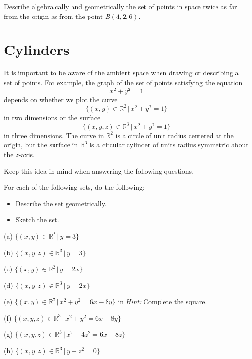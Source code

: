 \documentclass{ximera}
\begin{document}
\begin{example}  \label{Ex:9090dfsadf0}
Describe algebraically and geometrically the set of points in space twice as far from the origin as from the point $B(4,2,6)$.
\end{example}



\section*{Cylinders}

It is important to be aware of the ambient space when drawing or describing a set of points. For example, the graph of the set of points satisfying the equation 
\[
    x^2 + y^2 = 1
\]
depends on whether we plot the curve
\[
   \{  (x,y) \in\mathbb{R}^2 \, | \, x^2 + y^2 = 1 \}
\]
in two dimensions or the surface
\[
   \{  (x,y,z) \in\mathbb{R}^3 \, | \, x^2 + y^2 = 1 \}
\]
in three dimensions. The curve in $\mathbb{R}^2$ is a circle of unit radius centered at the origin, but the surface in $\mathbb{R}^3$ is a circular cylinder of units radius symmetric about the $z$-axis.

Keep this idea in mind when answering the following questions.

\begin{question} \label{Q1:Coordinates}
For each of the following sets, do the following:

\begin{itemize}
\item{Describe the set geometrically.}

\item{Sketch the set.}

\end{itemize}

(a) $\{  (x,y)\in \mathbb{R}^2 \, | \, y=3  \}$

(b) $\{  (x,y,z)\in \mathbb{R}^3 \, | \, y=3  \}$

(c) $\{  (x,y)\in \mathbb{R}^2 \, | \, y=2x  \}$

(d) $\{  (x,y,z)\in \mathbb{R}^3 \, | \, y=2x  \}$

(e) $\{  (x,y)\in \mathbb{R}^2 \, | \,  x^2 + y^2 = 6x - 8y  \}$   in {\it Hint:} Complete the square.

(f)  $\{  (x,y,z)\in \mathbb{R}^3 \, | \, x^2 + y^2 = 6x - 8y  \}$

(g) $\{  (x,y,z)\in \mathbb{R}^3 \, | \, x^2 +4z^2 = 6x - 8z  \}$

(h) $\{  (x,y,z)\in \mathbb{R}^3 \, | \, y+z^2= 0  \}$

\end{question}
\end{document}
